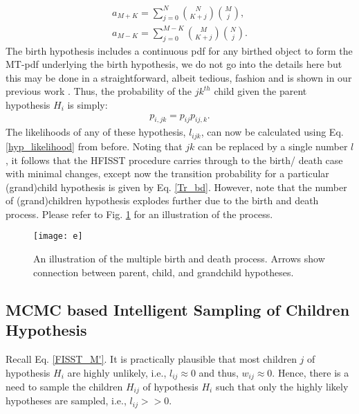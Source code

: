 \documentclass[10pt, conference]{IEEEtran}
\begin{document}
\begin{align}\label{n_da_a}
a_{M+K}= \sum_{j=0}^{N} {N \choose {K+j}} {M \choose {j}},\\
a_{M-K} = \sum_{j=0}^{M-K} {M \choose {K+j}} {N \choose j}.
\end{align}
The birth hypothesis includes a continuous pdf for any birthed object to form the MT-pdf underlying the birth hypothesis, we do not go into the details here but this may be done in a straightforward, albeit tedious, fashion and is shown in our previous work \cite{Faber1, Faber2}. Thus, the probability of the $jk^{th}$ child given the parent hypothesis $H_i$ is simply:
\begin{align} \label{Tr_bd}
p_{i,jk} = p_{ij}p_{ij,k}.
\end{align}
The likelihoods of any of these hypothesis, $l_{ijk}$, can now be calculated using Eq. \ref{hyp_likelihood} from before. Noting that $jk$ can be replaced by a single number $l$, it follows that the HFISST procedure carries through to the birth/ death case with minimal changes, except now the transition probability for a particular (grand)child hypothesis is given by Eq. \ref{Tr_bd}. However, note that the number of (grand)children hypothesis explodes further due to the birth and death process. Please refer to Fig. \ref{tree} for an illustration of the process. 
\begin{figure}[h]
\centering
\texttt{[image: e]}
\caption{An illustration of the multiple birth and death process. Arrows show connection between parent, child, and grandchild hypotheses.}
\label{tree}
\end{figure}
\subsection{MCMC based Intelligent Sampling of Children Hypothesis}
Recall Eq. \ref{FISST_M'}. It is practically plausible that most children $j$ of hypothesis $H_i$ are highly unlikely, i.e., $l_{ij} \approx 0$ and thus, $w_{ij} \approx 0$. Hence, there is a need to sample the children $H_{ij}$ of hypothesis $H_i$ such that only the highly likely hypotheses are sampled, i.e., $l_{ij} >> 0$. 
\end{document}
